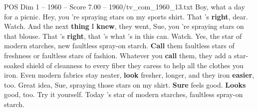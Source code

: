 \begin{textsample}{POS Dim 1 – 1960 – Score 7.00 – 1960/tv\_com\_1960\_13.txt}  \label{ex:f1_pos_028}
Boy, what a day for a picnic.
Hey, you 're spraying stars on my sports shirt.
That 's \textbf{right}, dear.
Watch.
And the next \textbf{thing} I \textbf{knew}, they went, Sue, you 're spraying stars on that blouse.
That 's \textbf{right}, that 's what 's in this can.
Watch.
Yes, the star of modern starches, new faultless spray-on starch. \textbf{Call} them faultless stars of freshness or faultless stars of fashion.
Whatever you \textbf{call} them, they add a star-soaked shield of cleanness to every fiber they caress to help all the clothes you iron.
Even modern fabrics stay neater, \textbf{look} fresher, longer, and they iron \textbf{easier}, too.
Great idea, Sue, spraying those stars on my shirt. \textbf{Sure} feels good. \textbf{Looks} good, too.
Try it yourself.
Today 's star of modern starches, faultless spray-on starch.

\end{textsample}
